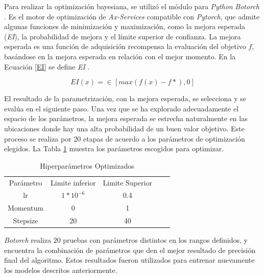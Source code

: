 Para realizar la optimización bayesiana, se utilizó el módulo para \textit{Python} \textit{Botorch}  \cite{balandat2020botorch}. Es el motor de optimización de \textit{Ax-Services} compatible con \textit{Pytorch}, que admite algunas funciones de minimización y maximización, como la mejora esperada (\textit{EI}), la probabilidad de mejora y el límite superior de confianza. La mejora esperada es una función de adquisición recompensa la evaluación del objetivo $f$, basándose en la mejora esperada en relación con el mejor momento. En la Ecuación \ref{EI} se define  \textit{EI} .

\begin{equation}
	{EI(x)=\in[max(f(x)-f*),0]}
	\label{EI}
\end{equation}

El resultado de la parametrización, con la mejora esperada, se selecciona y se evalúa en el siguiente paso. Una vez que se ha explorado adecuadamente el espacio de los parámetros, la mejora esperada se estrecha naturalmente en las ubicaciones donde hay una alta probabilidad de un buen valor objetivo. Este proceso se realiza por 20 etapas de acuerdo a los parámetros de optimización elegidos. La Tabla \ref{paraopt} muestra los parámetros escogidos para optimizar.

\begin{table}[ht]
	\centering
	\begin{tabular}{|c|c|c|ll}
		\cline{1-3}
		Parámetro & Limite inferior              & Limite Superior &  &  \\ \cline{1-3}
		lr         & $1*10^{-6}$ & 0.4             &  &  \\ \cline{1-3}
		Momentum   & 0                            & 1               &  &  \\ \cline{1-3}
		Stepsize   & 20                           & 40              &  &  \\ \cline{1-3}
	\end{tabular}
	\caption{Hiperparámetros Optimizados}
	\label{paraopt}
\end{table}

\textit{Botorch} realiza $20$ pruebas con parámetros distintos en los rangos definidos, y encuentra la combinación de parámetros que den el mejor resultado de precisión final del algoritmo. Estos resultados fueron utilizados para entrenar nuevamente los modelos descritos anteriormente. 




\newpage	
